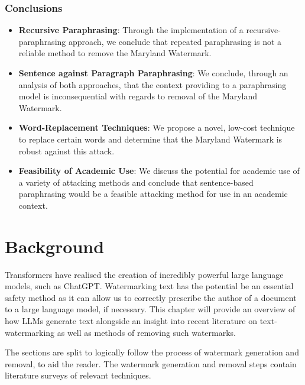 \documentclass{l4proj}
\theoremstyle{definition}
\begin{document}
        \subsection{Conclusions}
            \begin{itemize}
                \item \textbf{Recursive Paraphrasing}: Through the implementation of a recursive-paraphrasing approach, we conclude that repeated paraphrasing is not a reliable method to remove the Maryland Watermark.
                \item \textbf{Sentence against Paragraph Paraphrasing}: We conclude, through an analysis of both approaches, that the context providing to a paraphrasing model is inconsequential with regards to removal of the Maryland Watermark.
                \item \textbf{Word-Replacement Techniques}: We propose a novel, low-cost technique to replace certain words and determine that the Maryland Watermark is robust against this attack.
                \item \textbf{Feasibility of Academic Use}: We discuss the potential for academic use of a variety of attacking methods and conclude that sentence-based paraphrasing would be a feasible attacking method for use in an academic context.
            \end{itemize}
        
    
\chapter{Background}
\label{chap:background}
\nocite{vaswani2023attention}
Transformers have realised the creation of incredibly powerful large language models, such as ChatGPT. Watermarking text has the potential be an essential safety method as it can allow us to correctly prescribe the author of a document to a large language model, if necessary. This chapter will provide an overview of how LLMs generate text alongside an insight into recent literature on text-watermarking as well as methods of removing such watermarks. 

The sections are split to logically follow the process of watermark generation and removal, to aid the reader. The watermark generation and removal steps contain literature surveys of relevant techniques. 
\end{document}
